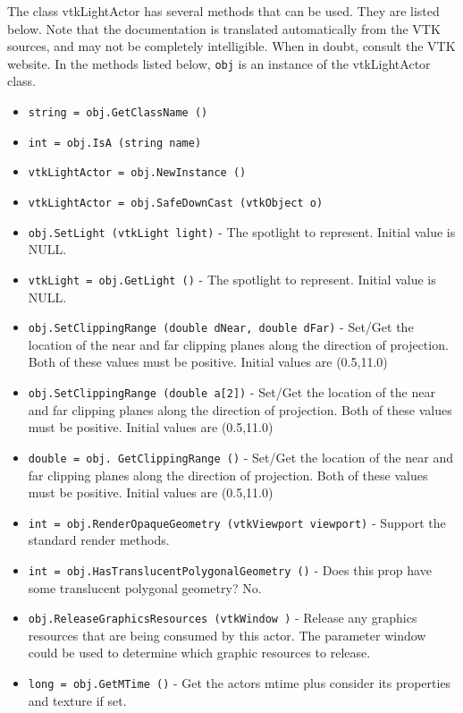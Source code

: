 The class vtkLightActor has several methods that can be used.
  They are listed below.
Note that the documentation is translated automatically from the VTK sources,
and may not be completely intelligible.  When in doubt, consult the VTK website.
In the methods listed below, \verb|obj| is an instance of the vtkLightActor class.
\begin{itemize}
\item  \verb|string = obj.GetClassName ()|

\item  \verb|int = obj.IsA (string name)|

\item  \verb|vtkLightActor = obj.NewInstance ()|

\item  \verb|vtkLightActor = obj.SafeDownCast (vtkObject o)|

\item  \verb|obj.SetLight (vtkLight light)| -  The spotlight to represent. Initial value is NULL.

\item  \verb|vtkLight = obj.GetLight ()| -  The spotlight to represent. Initial value is NULL.

\item  \verb|obj.SetClippingRange (double dNear, double dFar)| -  Set/Get the location of the near and far clipping planes along the
 direction of projection.  Both of these values must be positive.
 Initial values are  (0.5,11.0)

\item  \verb|obj.SetClippingRange (double a[2])| -  Set/Get the location of the near and far clipping planes along the
 direction of projection.  Both of these values must be positive.
 Initial values are  (0.5,11.0)

\item  \verb|double = obj. GetClippingRange ()| -  Set/Get the location of the near and far clipping planes along the
 direction of projection.  Both of these values must be positive.
 Initial values are  (0.5,11.0)

\item  \verb|int = obj.RenderOpaqueGeometry (vtkViewport viewport)| -  Support the standard render methods.

\item  \verb|int = obj.HasTranslucentPolygonalGeometry ()| -  Does this prop have some translucent polygonal geometry? No.

\item  \verb|obj.ReleaseGraphicsResources (vtkWindow )| -  Release any graphics resources that are being consumed by this actor.
 The parameter window could be used to determine which graphic
 resources to release.

\item  \verb|long = obj.GetMTime ()| -  Get the actors mtime plus consider its properties and texture if set.

\end{itemize}
